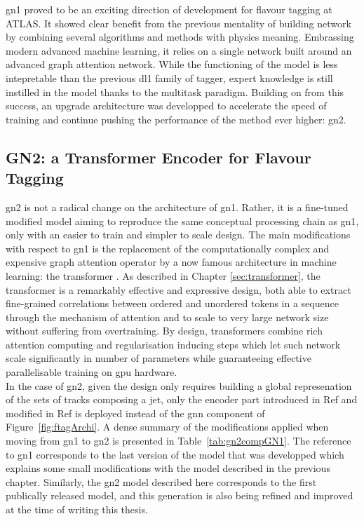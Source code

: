 \gls{gn1} proved to be an exciting direction of development for flavour tagging at ATLAS. It showed clear benefit from the previous mentality of building network by combining several algorithms and methods with physics meaning. Embrassing modern advanced machine learning, it relies on a single network built around an advanced graph attention network. While the functioning of the model is less intepretable than the previous \gls{dl1} family of tagger, expert knowledge is still instilled in the model thanks to the multitask paradigm. Building on from this success, an upgrade architecture was developped to accelerate the speed of training and continue pushing the performance of the method ever higher: \gls{gn2}.

\subsection{GN2: a Transformer Encoder for Flavour Tagging}\label{chap-GN2}
\gls{gn2} is not a radical change on the architecture of \gls{gn1}. Rather, it is a fine-tuned modified model aiming to reproduce the same conceptual processing chain as \gls{gn1}, only with an easier to train and simpler to scale design. The main modifications with respect to \gls{gn1} is the replacement of the computationally complex and expensive graph attention operator by a now famous architecture in machine learning: the transformer \cite{NIPS_transformerPaper}. As described in Chapter \ref{sec:transformer}, the transformer is a remarkably effective and expressive design, both able to extract fine-grained correlations between ordered and unordered tokens in a sequence through the mechanism of attention and to scale to very large network size without suffering from overtraining. By design, transformers combine rich attention computing and regularisation inducing steps which let such network scale significantly in number of parameters while guaranteeing effective parallelisable training on \gls{gpu} hardware. \\

In the case of \gls{gn2}, given the design only requires building a global represenation of the sets of tracks composing a jet, only the encoder part introduced in Ref \cite{NIPS_transformerPaper} and modified in Ref \cite{shleifer2021normformer} is deployed instead of the \gls{gnn} component of Figure~\ref{fig:ftagArchi}. A dense summary of the modifications applied when moving from \gls{gn1} to \gls{gn2} is presented in Table~\ref{tab:gn2compGN1}. The reference to \gls{gn1} corresponds to the last version of the model that was developped which explains some small modifications with the model described in the previous chapter. Similarly, the \gls{gn2} model described here corresponds to the first publically released model, and this generation is also being refined and improved at the time of writing this thesis. 

